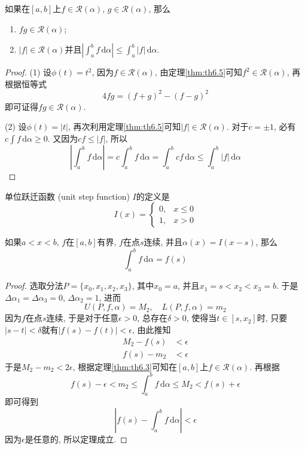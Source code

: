 \documentclass[cn,12pt,math=mtpro2,citestyle=gb7714-2015,bibstyle=gb7714-2015,twocol]{elegantbook}
\newcommand{\da}{\,\text{d}\alpha}
\begin{document}
\begin{theorem}\label{thm:th6.6}
  如果在$[a,b]$上$f\in\mathscr{R}(\alpha)$, $g\in\mathscr{R}(\alpha)$, 那么
  \begin{enumerate}[label=(\arabic*)]
  \item $fg\in\mathscr{R}(\alpha)$;

  \item $|f|\in\mathscr{R}(\alpha)$并且$\left|\int_{a}^{b}f\da\right|\leq\int_{a}^{b}|f|\da$.
  \end{enumerate}
\end{theorem}
\begin{proof}
  (1) 设$\phi(t)=t^2$, 因为$f\in\mathscr{R}(\alpha)$, 由定理\ref{thm:th6.5}可知$f^2\in\mathscr{R}(\alpha)$, 再根据恒等式
  $$4fg=(f+g)^2-(f-g)^2$$
  即可证得$fg\in\mathscr{R}(\alpha)$.

  (2) 设$\phi(t)=|t|$, 再次利用定理\ref{thm:th6.5}可知$|f|\in\mathscr{R}(\alpha)$. 对于$c=\pm 1$, 必有
  $ c\!\int f\da\geq0$. 又因为$cf\leq|f|$, 所以
  $$ \left|\int_{a}^{b}f\da\right|=\!c\int_a^b f\da=\int_a^b cf\da\leq\int_a^b|f|\da$$


\end{proof}
\begin{definition}
  单位跃迁函数 (unit step function) $I$的定义是
  $$I(x)=\begin{cases}
0, & x\leq 0 \\
1, & x>0 \end{cases}$$
\end{definition}
\begin{theorem}\label{thm:th6.7}
  如果$a<x<b$, $f$在$[a,b]$有界, $f$在点$s$连续, 并且$\alpha(x)=I(x-s)$, 那么
  $$\int_{a}^{b}f\da=f(s)$$
\end{theorem}
\begin{proof}
  选取分法$P=\{x_0,x_1,x_2,x_3\}$, 其中$x_0=a$, 并且$x_1=s<x_2<x_3=b$. 于是$\Delta\alpha_1=\Delta\alpha_3=0$, $\Delta\alpha_2=1$, 进而
  $$U(P,f,\alpha)=M_2,\quad L(P,f,\alpha)=m_2$$
  因为$f$在点$s$连续, 于是对于任意$\epsilon>0$, 总存在$\delta>0$, 使得当$t\in[s,x_2]$时, 只要$|s-t|<\delta$就有$|f(s)-f(t)|<\epsilon$, 由此推知
  \begin{align*}
  M_2-f(s)&<\epsilon \\
  f(s)-m_2&<\epsilon
  \end{align*}
  于是$M_2-m_2<2\epsilon$, 根据定理\ref{thm:th6.3}可知在$[a,b]$上$f\in\mathscr{R}(\alpha)$. 再根据
  $$f(s)-\epsilon<m_2\leq\int_{a}^{b}f\da\leq M_2<f(s)+\epsilon$$
  即可得到
  $$\left|f(s)-\int_{a}^{b}f\da\right|<\epsilon$$
  因为$\epsilon$是任意的, 所以定理成立.


\end{proof}
\end{document}
